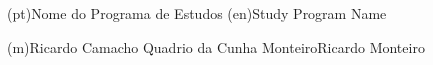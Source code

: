 \ntdegreename*(pt){Nome do Programa de Estudos}
\ntdegreename*(en){Study Program Name}




\ntauthorname(m){Ricardo Camacho Quadrio da Cunha Monteiro}{Ricardo Monteiro}


